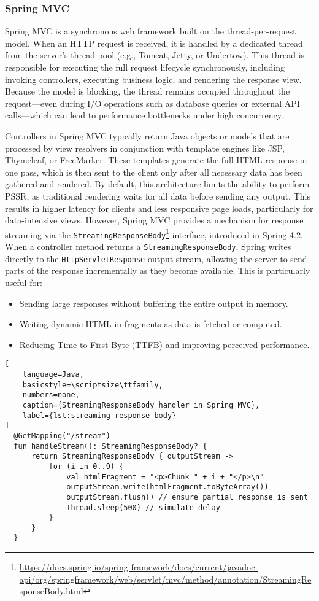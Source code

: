 \subsubsection{Spring MVC}

Spring MVC is a synchronous web framework built on the thread-per-request
model. When an HTTP request is received, it is handled by a dedicated thread
from the server’s thread pool (e.g., Tomcat, Jetty, or Undertow). This thread
is responsible for executing the full request lifecycle synchronously,
including invoking controllers, executing business logic, and rendering the
response view. Because the model is blocking, the thread remains occupied
throughout the request—even during I/O operations such as database queries or
external API calls—which can lead to performance bottlenecks under high
concurrency.

Controllers in Spring MVC typically return Java objects or models that are
processed by view resolvers in conjunction with template engines like JSP,
Thymeleaf, or FreeMarker. These templates generate the full HTML response in
one pass, which is then sent to the client only after all necessary data has
been gathered and rendered. By default, this architecture limits the ability to
perform PSSR, as traditional rendering waits for all data before sending any
output. This results in higher latency for clients and less responsive page
loads, particularly for data-intensive views. However, Spring MVC provides a
mechanism for response streaming via the
\texttt{StreamingResponseBody}\footnote{\url{https://docs.spring.io/spring-framework/docs/current/javadoc-api/org/springframework/web/servlet/mvc/method/annotation/StreamingResponseBody.html}}
interface, introduced in Spring 4.2. When a controller method returns a
\texttt{StreamingResponseBody}, Spring writes directly to the
\texttt{HttpServletResponse} output stream, allowing the server to send parts
of the response incrementally as they become available. This is particularly
useful for:
\begin{itemize}
    \item Sending large responses without buffering the entire output in memory.
    \item Writing dynamic HTML in fragments as data is fetched or computed.
    \item Reducing Time to First Byte (TTFB) and improving perceived performance.
\end{itemize}

\begin{lstlisting}[
    language=Java,
    basicstyle=\scriptsize\ttfamily,
    numbers=none,
    caption={StreamingResponseBody handler in Spring MVC},
    label={lst:streaming-response-body}
]
  @GetMapping("/stream")
  fun handleStream(): StreamingResponseBody? {
      return StreamingResponseBody { outputStream ->
          for (i in 0..9) {
              val htmlFragment = "<p>Chunk " + i + "</p>\n"
              outputStream.write(htmlFragment.toByteArray())
              outputStream.flush() // ensure partial response is sent
              Thread.sleep(500) // simulate delay
          }
      }
  }
\end{lstlisting}


